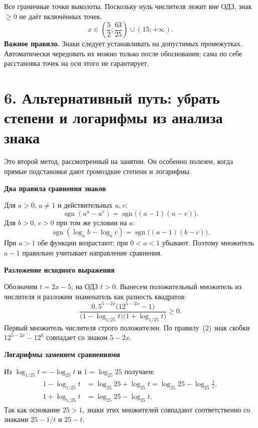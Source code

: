 \documentclass[a4paper,12pt]{article}
\newcommand{\lead}[1]{\textcolor{darkaccent}{\textbf{#1}}}
\newcommand{\work}[1]{\par\vspace{3pt}\textcolor{darkaccent}{\large\bfseries #1}\par\vspace{3pt}}
\begin{document}
\begin{center}
\end{center}
Все граничные точки выколоты. Поскольку нуль числителя лежит вне ОДЗ, знак $\ge0$ не даёт включённых точек.
\[
\boxed{\displaystyle x\in\left(\frac52;\frac{63}{25}\right)\cup(15;+\infty)}.
\]
\lead{Важное правило.} Знаки следует устанавливать на допустимых промежутках. Автоматически чередовать их можно только после обоснования; сама по себе расстановка точек на оси этого не гарантирует.

\section*{6. Альтернативный путь: убрать степени и логарифмы из анализа знака}
Это второй метод, рассмотренный на занятии. Он особенно полезен, когда прямые подстановки дают громоздкие степени и логарифмы.

\work{Два правила сравнения знаков}
Для $a>0$, $a\ne1$ и действительных $u,v$:
\[
\operatorname{sgn}(a^u-a^v)=\operatorname{sgn}\bigl((a-1)(u-v)\bigr).
\tag{2}
\]
Для $b>0$, $c>0$ при том же условии на $a$:
\[
\operatorname{sgn}(\log_a b-\log_a c)
 =\operatorname{sgn}\bigl((a-1)(b-c)\bigr).
\tag{3}
\]
При $a>1$ обе функции возрастают; при $0<a<1$ убывают. Поэтому множитель $a-1$ правильно учитывает направление сравнения.

\work{Разложение исходного выражения}
Обозначим $t=2x-5$; на ОДЗ $t>0$. Вынесем положительный множитель из числителя и разложим знаменатель как разность квадратов:
\[
\frac{0{,}5^{5-2x}\bigl(12^{5-2x}-1\bigr)}
{\bigl(1-\log_{1/25}t\bigr)\bigl(1+\log_{1/25}t\bigr)}\ge0.
\]
Первый множитель числителя строго положителен. По правилу~(2) знак скобки $12^{5-2x}-12^0$ совпадает со знаком $5-2x$.

\work{Логарифмы заменяем сравнениями}
Из $\log_{1/25}t=-\log_{25}t$ и $1=\log_{25}25$ получаем:
\begin{align*}
1-\log_{1/25}t&=\log_{25}25+\log_{25}t
=\log_{25}25-\log_{25}\!\frac1t,\\
1+\log_{1/25}t&=\log_{25}25-\log_{25}t.
\end{align*}
Так как основание $25>1$, знаки этих множителей совпадают соответственно со знаками $25-1/t$ и $25-t$.
\end{document}
